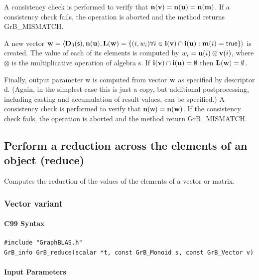 \documentclass[11pt]{extarticle}
\begin{document}
{A consistency check is performed to verify that $\bold{n}({\bf v})
= \bold{n}({\bf u}) = \bold{n}({\bf m})$. If a consistency
check fails, the operation is aborted and the method returns {\sf
GrB\_MISMATCH}.

A new vector ${\bf w} = \langle \bold{D}_3({\sf s}),
\bold{n}({\bf u}), \bold{L}({\bf w}) = \{(i,w_i)  \forall i \in
{\bf i}({\bf v}) \cap {\bf i}({\bf u}) : {\bf m}(i)
= {\sf true} \} \rangle$ is created.  The value of each of its
elements is computed by $w_i = {\bf u}(i) \otimes {\bf v}(i)$,
where $\otimes$ is the multiplicative operation of algebra {\sf s}.
If ${\bf i}({\bf v}) \cap {\bf i}({\bf u}) = \emptyset$
then $\bold{L}({\bf w}) = \emptyset$.

Finally, output parameter {\sf w} is computed from vector ${\bf w}$
as specified by descriptor {\sf d}. (Again, in the simplest case this
is just a copy, but additional postprocessing, including casting and
accumulation of result values, can be specified.)  A consistency check is
performed to verify that $\bold{n}({\sf w}) = \bold{n}({\bf w})$. If
the consistency check fails, the operation is aborted and the method
return {\sf GrB\_MISMATCH}.

\subsection{Perform a reduction across the elements of an object ({\sf reduce})}

Computes the reduction of the values of the elements of a vector or matrix.

\subsubsection{Vector variant}

\paragraph{C99 Syntax}

\begin{verbatim}
#include "GraphBLAS.h"
GrB_info GrB_reduce(scalar *t, const GrB_Monoid s, const GrB_Vector v)
\end{verbatim}

\paragraph{Input Parameters}

}
\end{document}
